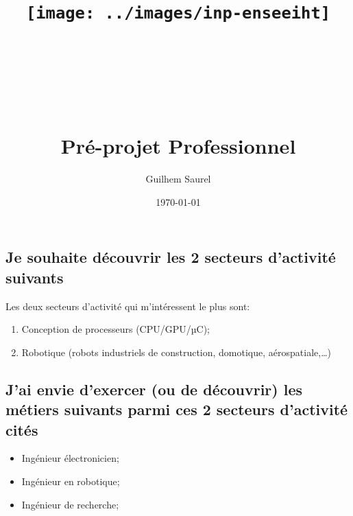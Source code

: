 \documentclass[10pt]{article}
\title{\texttt{[image: ../images/inp-enseeiht]} \\ ~ \\ ~ \\ ~ \\ ~ \\
Pré-projet Professionnel}
\author{Guilhem Saurel}
\date{\today}
\begin{document}
\begin{titlepage}
    \maketitle
    \tableofcontents
\end{titlepage}

\section{}
\subsection{Je souhaite découvrir les 2 secteurs d’activité suivants}
Les deux secteurs d’activité qui m’intéressent le plus sont:
\begin{enumerate}
    \item Conception de processeurs (CPU/GPU/µC);
    \item Robotique (robots industriels de construction, domotique, aérospatiale,…)
\end{enumerate}
\subsection{J’ai envie d’exercer (ou de découvrir) les métiers suivants parmi ces 2 secteurs d’activité cités}
\begin{itemize}
    \item Ingénieur électronicien;
    \item Ingénieur en robotique;
    \item Ingénieur de recherche;
\end{itemize}
\end{document}
